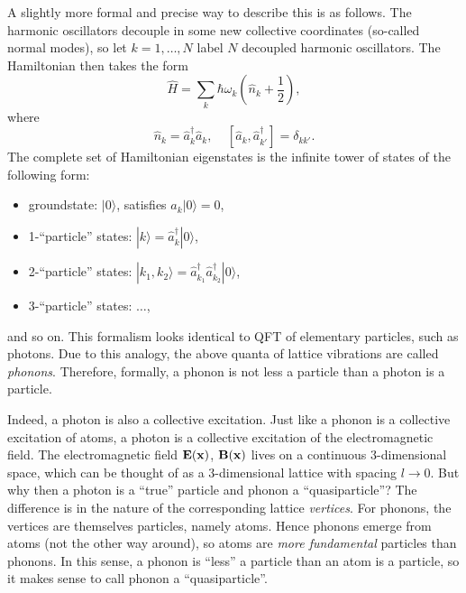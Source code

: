 \documentclass[12pt]{article}
\begin{document}
A slightly more formal and precise way to describe this is as follows.
The harmonic oscillators decouple in some new collective coordinates (so-called normal modes), 
so let $k=1,\ldots ,N$ label $N$ decoupled harmonic oscillators. The Hamiltonian then takes the form
\begin{equation}
 \hat{H}=\sum_k \hbar\omega_k \left( \hat{n}_k +\frac{1}{2}\right) , 
\end{equation}
where
\begin{equation}
 \hat{n}_k =\hat{a}_k^{\dagger}\hat{a}_k, \;\;\;\; [\hat{a}_k,\hat{a}_{k'}^{\dagger}]=\delta_{kk'} .
\end{equation}
The complete set of Hamiltonian eigenstates is the infinite tower of states of the following form: 
\begin{itemize}
\item groundstate: $|0\rangle$, satisfies $\hat{a}_k|0\rangle=0$, 
\item 1-``particle'' states: $|k\rangle=\hat{a}_{k}^{\dagger}|0\rangle$, 
\item 2-``particle'' states: $|k_1,k_2\rangle=\hat{a}_{k_1}^{\dagger}\hat{a}_{k_2}^{\dagger}|0\rangle$, 
\item 3-``particle'' states: $\ldots$,
\end{itemize}
and so on. This formalism looks identical to QFT 
of elementary particles, such as  photons. 
Due to this analogy, the above quanta of lattice vibrations 
are called {\em phonons}. 
Therefore, formally, a phonon is not less a particle than a photon is a particle. 

Indeed, a photon is also a collective excitation. Just like a phonon is a collective excitation of atoms,
a photon is a collective excitation of the electromagnetic field. 
The electromagnetic field ${\bf E}({\bf x})$, ${\bf B}({\bf x})$ lives on a continuous 3-dimensional space, 
which can be thought of as a 3-dimensional lattice with spacing $l\rightarrow 0$.
But why then a photon is a ``true'' particle and phonon a ``quasiparticle''?
The difference is in the nature of the corresponding lattice {\em vertices}. 
For phonons, the vertices are themselves particles, namely atoms. 
Hence phonons emerge from atoms (not the other way around), 
so atoms are {\em more fundamental} particles than phonons. 
In this sense, a phonon is ``less'' a particle than an atom is a particle, 
so it makes sense to call phonon a ``quasiparticle''.
\end{document}
